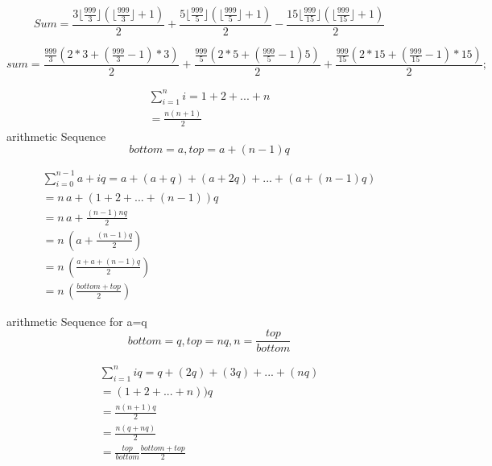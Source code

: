 \documentclass{article}
\begin{document}

\begin{equation}
Sum=\frac{3\lfloor\frac{999}{3}\rfloor(\lfloor\frac{999}{3}\rfloor+1)}{2} + \frac{5\lfloor\frac{999}{5}\rfloor(\lfloor\frac{999}{5}\rfloor+1)}{2} - \frac{15\lfloor\frac{999}{15}\rfloor(\lfloor\frac{999}{15}\rfloor+1)}{2}
\end{equation}

\begin{equation}
sum = \frac{\frac{999}{3}(2*3+(\frac{999}{3}-1)*3)}{2} + \frac{\frac{999}{5}(2*5+(\frac{999}{5}-1)5)}{2} + \frac{\frac{999}{15}(2*15+(\frac{999}{15}-1)*15)}{2};
\end{equation}

\begin{align}
\sum_{i=1}^{n} i = 1 + 2 + ... + n \\
=\frac{n(n+1)}{2}
\end{align}
arithmetic Sequence
$$bottom=a,top=a+(n-1)q$$

\begin{align}
\sum_{i=0}^{n-1} a+iq = a + (a+q) + (a+2q) + ... + (a+(n-1)q) \\
= n\,a + (1+2+ ... +(n-1))q\\
= n\,a + \frac{(n-1)nq}{2}\\
= n\,(a + \frac{(n-1)q}{2})\\
= n\,(\frac{a + a +(n-1)q}{2})\\
= n\,(\frac{bottom + top}{2})
\end{align}

arithmetic Sequence for a=q
$$bottom=q,top=nq,n=\frac{top}{bottom}$$

\begin{align}
\sum_{i=1}^{n} iq = q + (2q) + (3q) + ... + (nq) \\
= (1+2+ ... +n))q\\
= \frac{n(n+1)q}{2}\\
= \frac{n(q+nq)}{2}\\
= \frac{top}{bottom}\frac{bottom + top}{2}
\end{align}
\end{document}
